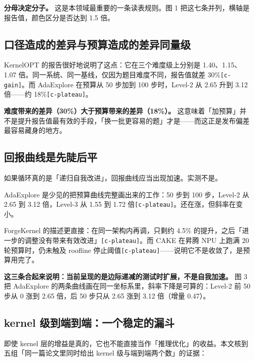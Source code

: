 \textbf{分母决定分子。} 这是本领域最重要的一条读表规则。图 1 把这七条并列，横轴是报告值，颜色区分是否达到 1.5 倍。


\subsection{口径造成的差异与预算造成的差异同量级}

KernelOPT 的报告很好地说明了这点：它在三个难度级上分别是 1.40、1.15、1.07 倍。同一系统、同一基线，仅因为题目难度不同，报告值就差 30\%{\scriptsize\texttt{[c-\hspace{0pt}gain]}}。而 AdaExplore 在预算从 50 步加到 100 步时，Level-2 从 2.65 升到 3.12 倍——约 18\%{\scriptsize\texttt{[c-\hspace{0pt}plateau]}}。


\textbf{难度带来的差异（30\%）大于预算带来的差异（18\%）。} 这意味着「加预算」并不是提升报告值最有效的手段，「换一批更容易的题」才是——而这正是发布偏差最容易藏身的地方。


\subsection{回报曲线是先陡后平}

如果循环真的是「递归自我改进」，回报曲线应当出现加速。实测不是。


AdaExplore 是少见的把预算曲线完整画出来的工作：50 步到 100 步，Level-2 从 2.65 到 3.12 倍，Level-3 从 1.55 到 1.72 倍{\scriptsize\texttt{[c-\hspace{0pt}plateau]}}。还在涨，但斜率在变小。


ForgeKernel 的描述更直接：在同一架构内再调，只剩约 4.5\% 的提升，之后「进一步的调整没有带来有效改进」{\scriptsize\texttt{[c-\hspace{0pt}plateau]}}。而 CAKE 在昇腾 NPU 上跑满 20 轮预算时，仍未触及 roofline 停止阈值{\scriptsize\texttt{[c-\hspace{0pt}plateau]}}——说明它不是收敛了，是预算用完了。


\textbf{这三条合起来说明：当前呈现的是边际递减的测试时扩展，不是自我加速。} 图 3 把 AdaExplore 的两条曲线画在同一坐标系里，斜率下降是可算的：Level-2 前 50 步从 0 涨到 2.65 倍，后 50 步只从 2.65 涨到 3.12 倍（增量 0.47）。


\subsection{kernel 级到端到端：一个稳定的漏斗}

即使 kernel 层的增益是真的，它也不能直接当作「推理优化」的收益。本文核到五组「同一篇论文里同时给出 kernel 级与端到端两个数」的证据：


